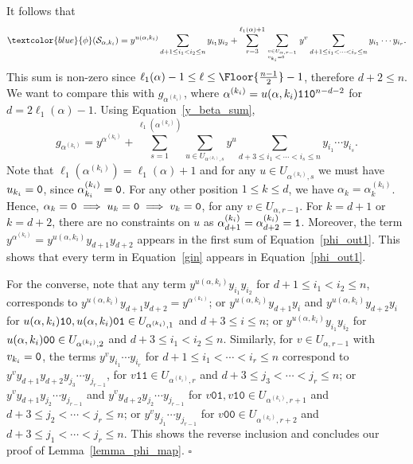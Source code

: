 \documentclass[10pt,a4paper]{article}
\newcommand{\blue}[1]{\textcolor{blue}{#1}}
\DeclarePairedDelimiter\Floor\lfloor\rfloor
\begin{document}
It follows that
\begin{equation}  \label{phi_out1}
    \blue{\phi}(\mathcal{S}_{\alpha, k_i}) =   y^{u(\alpha, k_i)} \sum_{d+1 \leq i_1 < i_2 \leq n}y_{i_1} y_{i_2} +  \sum_{r=3}^{\ell_1(\alpha)+1} \sum_{v \in U_{\alpha,r-1}\atop v_{k_i}=\textnormal{\texttt{0}}\hfill} y^v \sum_{d+1 \leq i_1 < \cdots < i_{r} \leq n}y_{i_1} \cdots  y_{i_{r}}.  
\end{equation}
This sum is non-zero since $\ell_1(\alpha)-1\le\ell \le \Floor{\frac{n-1}{2}}-1$, therefore $d+2\le n$.
We want to compare this with $g_{\alpha^{(k_i)}}$, where $\alpha^{(k_i)}=u(\alpha, k_i)\textnormal{\texttt{110}}^{n-d-2}$ for $d=2\ell_1(\alpha)-1$.
Using Equation~\eqref{y_beta_sum},
\begin{equation} \label{gin}
	g_{\alpha^{(k_i)}} = y^{{\alpha^{(k_i)}}}+  \sum_{s=1}^{\ell_1(\alpha^{(k_i)})} \sum_{u \in U_{\alpha^{(k_i)},s}} y^u
										\sum_{d+3 \leq i_1 < \cdots < i_s \leq n} y_{i_1} \cdots y_{i_{s}}. 
\end{equation}
Note that $\ell_1(\alpha^{(k_i)})=\ell_1(\alpha)+1$ and for any $u \in U_{\alpha^{(k_i)},s}$ we must have $u_{k_i}=\textnormal{\texttt{0}}$, since $\alpha^{(k_i)}_{k_i}=\textnormal{\texttt{0}}$. For any other position $1\le k\le d$, we have $\alpha_k=\alpha_k^{(k_i)}$. Hence, $\alpha_k=\textnormal{\texttt{0}} \implies u_k=\textnormal{\texttt{0}} \implies v_k=\textnormal{\texttt{0}}$, for any  $v\in U_{\alpha,r-1}$. For $k=d+1$ or $k=d+2$, there are no constraints on $u$ as $\alpha_{d+1}^{(k_i)}=\alpha_{d+2}^{(k_i)}=\textnormal{\texttt{1}}$. Moreover, the term $ y^{{\alpha^{(k_i)}}}=y^{u(\alpha, k_i)}y_{d+1}y_{d+2}$ appears in the first sum of Equation~\eqref{phi_out1}.
This shows that every term in Equation~\eqref{gin} appears in Equation~\eqref{phi_out1}.

For the converse, note that any term $y^{u(\alpha, k_i)} y_{i_1} y_{i_2}$  for $d+1 \leq i_1 < i_2 \leq  n$, corresponds to 
$y^{u(\alpha, k_i)} y_{d+1} y_{d+2}=y^{\alpha^{(k_1)}}$;
or $y^{u(\alpha, k_i)}y_{d+1}y_{i}$ and $y^{u(\alpha, k_i)}y_{d+2}y_{i}$ for $u(\alpha, k_i)\textnormal{\texttt{10}}, u(\alpha, k_i)\textnormal{\texttt{01}}\in U_{\alpha^{(k_i)},1}$ and
$d+3\le i\le n$;
or $y^{u(\alpha, k_i)}y_{i_1}y_{i_2}$ for $u(\alpha, k_i)\textnormal{\texttt{00}}\in U_{\alpha^{(k_i)},2}$ and $d+3\le i_1<i_2\le n$.
Similarly, for $v\in U_{\alpha,r-1}$ with $v_{k_i}=\textnormal{\texttt{0}}$, the terms $y^v y_{i_1} \cdots  y_{i_{r}} $ for $d+1 \leq i_1 < \cdots < i_{r} \leq n$ correspond to  
$y^vy_{d+1} y_{d+2} y_{j_{3}}\cdots  y_{j_{r-1}} $, for $v\texttt{11}\in U_{\alpha^{(k_i)},r}$ and $d+3 \leq j_3 < \cdots <j_{r} \leq n$; 
or 
$y^vy_{d+1} y_{j_{2}}\cdots  y_{j_{r-1}} $ and $y^vy_{d+2} y_{j_{2}}\cdots  y_{j_{r-1}} $ for $v\texttt{01},v\texttt{10} \in U_{\alpha^{(k_i)},r+1}$ and $d+3 \leq j_2< \cdots <j_{r} \leq n$;
or
$y^v y_{j_{1}}\cdots  y_{j_{r-1}} $ for $v\texttt{00} \in U_{\alpha^{(k_i)},r+2}$ and $d+3 \leq j_1< \cdots <j_{r} \leq n$.
This shows the reverse inclusion and concludes our proof of 
 Lemma~\ref{lemma_phi_map}. \hfill$\square$
\end{document}
